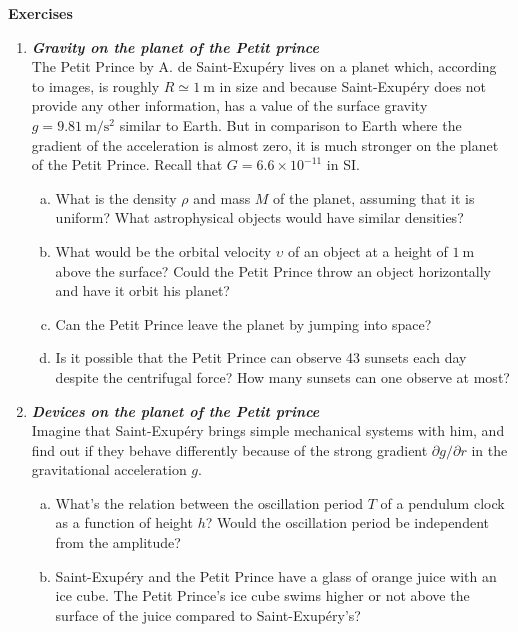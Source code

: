 \documentclass[a4paper,12pt]{article}
\newcommand{\question}[1]{\textbf{\textit{#1}}}
\begin{document}
{\bf Exercises}
\\
\begin{enumerate}

\item \question{Gravity on the planet of the Petit prince}\\
The Petit Prince by A. de Saint-Exup{\'e}ry lives on a planet which,
according to images, is roughly $R\simeq 1~\mathrm{m}$ in size and
because Saint-Exup{\'e}ry does not provide any other information, has a
value of the surface gravity $g=9.81~\mathrm{m}/\mathrm{s}^2$ similar
to Earth. But in comparison to Earth where the gradient of the
acceleration is almost zero, it is much stronger on the planet of the
Petit Prince. Recall that $G=6.6\times 10^{-11}$ in SI.
\begin{enumerate}[(a)]
\item{What is the density $\rho$ and mass $M$ of the planet, assuming that it is uniform? What astrophysical objects would have similar densities?}
\item{What would be the orbital velocity $\upsilon$ of an object at a height of $1~\mathrm{m}$ above the surface? Could the Petit Prince throw an object horizontally and have it orbit his planet?}
\item{Can the Petit Prince leave the planet by jumping into space?}
\item{Is it possible that the Petit Prince can observe 43 sunsets each day despite the centrifugal force? How many sunsets can one observe at most?}
\end{enumerate}

\item \question{Devices on the planet of the Petit prince}\\
Imagine that Saint-Exup{\'e}ry brings simple mechanical systems with him, and find out if they behave differently because of the strong gradient $\partial g/\partial r$ in the gravitational acceleration $g$.
\begin{enumerate}[(a)]
\item{What's the relation between the oscillation period $T$ of a pendulum clock as a function of height $h$? Would the oscillation period be independent from the amplitude?}
\item{Saint-Exup{\'e}ry and the Petit Prince have a glass of orange juice
    with an ice cube. The Petit Prince's ice cube swims higher or not above the surface of the juice compared to Saint-Exup{\'e}ry's?}
\end{enumerate}


\end{enumerate}
\end{document}
